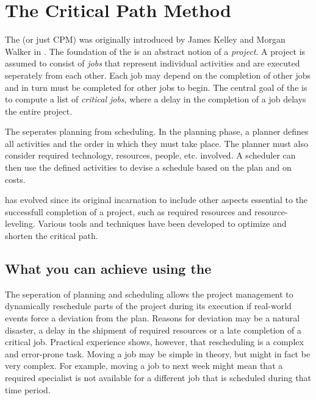 \section{The Critical Path Method}

The \cpm{} (or just CPM) was originally introduced by James Kelley and Morgan Walker in
\cite{Kelley:1959:CPS:1460299.1460318}. The foundation of the \cpm{} is an abstract notion of a
\emph{project}. A project is assumed to consist of \emph{jobs} that represent individual activities
and are executed seperately from each other. Each job may depend on the completion of other jobs and
in turn must be completed for other jobs to begin. The central goal of the \cpm{} is to compute a list
of \emph{critical jobs}, where a delay in the completion of a job delays the entire project.

The \cpm{} seperates planning from scheduling. In the planning phase, a planner defines all
activities and the order in which they must take place. The planner must also consider required 
technology, resources, people, etc. involved. A scheduler can then use the defined activities to
devise a schedule based on the plan and on costs\cite[p. 161]{Kelley:1959:CPS:1460299.1460318}.

\cpm{} has evolved since its original incarnation to include other aspects essential to the
successfull completion of a project, such as required resources and resource-leveling. Various tools
and techniques have been developed to optimize and shorten the critical path.

\subsection{What you can achieve using the \cpm}
The seperation of planning and scheduling allows the project management to dynamically reschedule
parts of the project during its execution if real-world events force a deviation from the plan.
Reasons for deviation may be a natural disaster, a delay in the shipment of required resources or
a late completion of a critical job. Practical experience shows, however, that rescheduling is a
complex and error-prone task. Moving a job may be simple in theory, but might in fact be very
complex. For example, moving a job to next week might mean that a required specialist is not
available for a different job that is scheduled during that time period.

